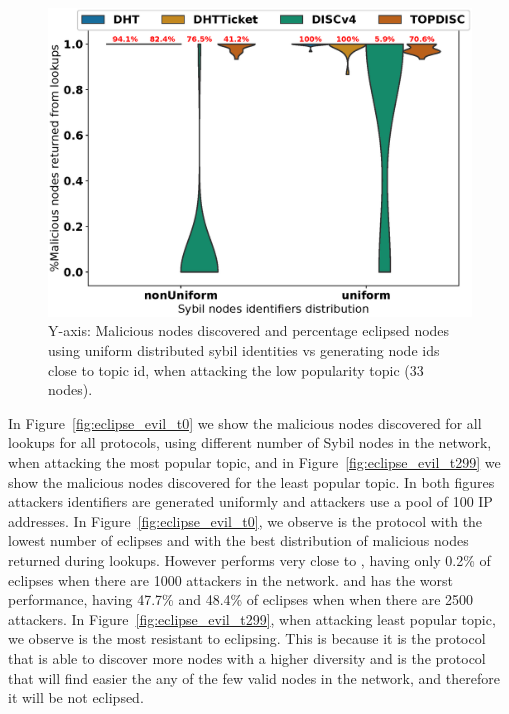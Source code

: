 \begin{figure}[!h]
\includegraphics[width=\linewidth]{results/security/violin_idDistribution_percentageMaliciousDiscovered_t299.eps}
\caption{Y-axis: Malicious nodes discovered and percentage eclipsed nodes using uniform distributed sybil identities vs generating node ids close to topic id,   when attacking the low popularity topic (33 nodes).}
\label{fig:eclipse_distribution_t299}
\end{figure}


In Figure~\ref{fig:eclipse_evil_t0} we show the malicious nodes discovered for all lookups for all protocols, using different number of Sybil nodes in the network,  when attacking the most popular topic,  and in Figure~\ref{fig:eclipse_evil_t299} we show the malicious nodes discovered for the least popular topic.  In both figures attackers identifiers are generated uniformly and attackers use a pool of 100 IP addresses. 
In Figure~\ref{fig:eclipse_evil_t0}, we observe \discv is the protocol with the lowest number of eclipses and with the best distribution of malicious nodes returned during lookups.  However \sysname performs very close to \discv, having only 0.2\% of eclipses when there are 1000 attackers in the network.
\altname and \altnameticket has the worst performance,  having 47.7\% and 48.4\% of eclipses when when there are 2500 attackers.
In Figure~\ref{fig:eclipse_evil_t299}, when attacking least popular topic, we observe \sysname is the most resistant to eclipsing.
This is because it is the protocol that is able to discover more nodes with a higher diversity and is the protocol that will find easier the any of the few valid nodes in the network, and therefore it will be not eclipsed.
 
